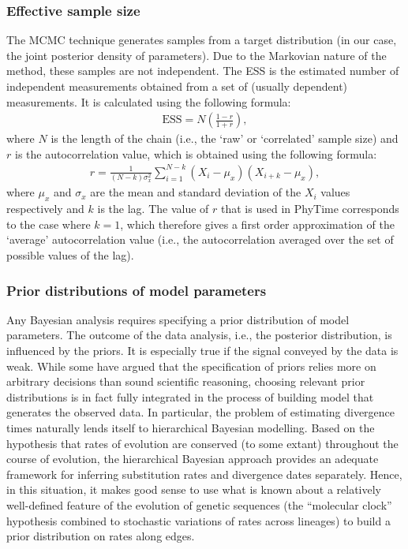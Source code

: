 \documentclass[a4paper,12pt]{article}
\begin{document}
\subsubsection{Effective sample size}\label{sec:ess}

The MCMC technique  generates samples from a  target distribution (in our case,  the joint posterior
density  of  parameters).  Due  to  the  Markovian  nature of  the  method,  these samples  are  not
independent.  The  ESS is the estimated  number of independent  measurements obtained from a  set of
(usually dependent) measurements. It is calculated using the following formula:
\begin{eqnarray*}
\mathrm{ESS} = N\left(\frac{1-r}{1+r}\right),
\end{eqnarray*}
where  $N$  is the  length  of  the  chain  (i.e., the  `raw'  or `correlated' sample  size)  and $r$  is  the
autocorrelation value, which is obtained using the following formula:
\begin{eqnarray*}
r = \frac{1}{(N-k)\sigma_x^2} \sum_{i=1}^{N-k} (X_i - \mu_x)(X_{i+k}-\mu_x),
\end{eqnarray*} where $\mu_x$ and $\sigma_x$ are the mean and standard deviation of the $X_i$ values
respectively and $k$ is the lag. The value of $r$ that is used in PhyTime corresponds to the case where $k=1$,
which therefore gives a first order  approximation of the `average' autocorrelation value (i.e., the
autocorrelation averaged over the set of possible values of the lag).


\subsubsection{Prior distributions of model parameters}\label{sec:prior}

Any Bayesian analysis requires  specifying a prior distribution of model  parameters. The outcome of
the data analysis, i.e., the posterior distribution,  is influenced by the priors.  It is especially
true if the signal conveyed  by the data is weak.  While some have  argued that the specification of
priors relies more  on arbitrary decisions than sound scientific  reasoning, choosing relevant prior
distributions  is in  fact fully  integrated in  the process  of building  model that  generates the
observed data.  In particular, the problem of  estimating divergence times naturally lends itself to
hierarchical Bayesian modelling.  Based on the hypothesis  that rates of evolution are conserved (to
some extant)  throughout the  course of  evolution, the hierarchical  Bayesian approach  provides an
adequate framework for inferring substitution rates  and divergence dates separately. Hence, in this
situation, it makes good  sense to use what is known about a  relatively well-defined feature of the
evolution of genetic sequences (the ``molecular  clock'' hypothesis combined to stochastic variations of
rates across lineages) to build a prior distribution on rates along edges.
  
\end{document}
